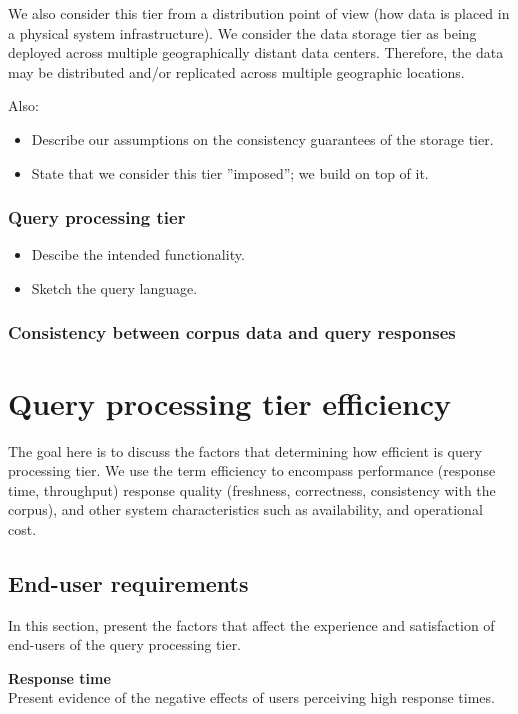 We also consider this tier from a distribution point of view (how data is placed in a physical system infrastructure).
We consider the data storage tier as being deployed across multiple geographically distant data centers.
Therefore, the data may be distributed and/or replicated across multiple geographic locations.

Also:
\begin{itemize}
  \item Describe our assumptions on the consistency guarantees of the storage tier.
  \item State that we consider this tier ''imposed''; we build on top of it.
\end{itemize}

\subsubsection{Query processing tier}

\begin{itemize}
  \item Descibe the intended functionality.
  \item Sketch the query language.
\end{itemize}


\subsubsection{Consistency between corpus data and query responses}

\section{Query processing tier efficiency}
\label{sec:requirements}

The goal here is to discuss the factors that determining how efficient is query processing tier.
We use the term efficiency to encompass performance (response time, throughput) response quality (freshness,
correctness, consistency with the corpus), and other system characteristics such as availability, and operational cost.

\subsection{End-user requirements}
In this section, present the factors that affect the experience and satisfaction of end-users of the query processing
tier.

\textbf{Response time} \\
Present evidence of the negative effects of users perceiving high response times.

